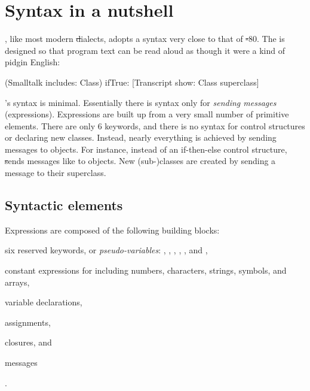 \documentclass[a4paper,10pt,twoside]{book}
\begin{document}
	\renewcommand{\nnbb}[2]{} %
\fi
\chapter{Syntax in a nutshell}
\label{cha:syntax}


\sq, like most modern \st dialects, adopts a syntax very close to that of \st-80.
The  is designed so that program text can be read aloud as though it were a kind of pidgin English:

\begin{code}{}
(Smalltalk includes: Class) ifTrue: [Transcript show: Class superclass]
\end{code}

\noindent
\sq's syntax is minimal.
Essentially there is syntax only for \emph{sending messages} (\ie expressions).
Expressions are built up from a very small number of  primitive elements.
There are only 6 keywords, and there is no syntax for control structures or declaring new classes.
Instead, nearly everything is achieved by sending messages to objects.
For instance, instead of an if-then-else control structure, \st sends messages like  to  objects.
New \mbox{(sub-)classes} are created by sending a message to their superclass.

\section{Syntactic elements}

Expressions are composed of the following building blocks:
\begin{enumerate*} [label=(\roman*)]
	\item six reserved keywords, or \emph{pseudo-variables}:
	, , , , , and ,
	\item constant expressions for  including numbers, characters, strings, symbols, and arrays,
	\item variable declarations,
	\item assignments,
	\item {} closures,
	and \item messages%
\end{enumerate*}.
\end{document}
